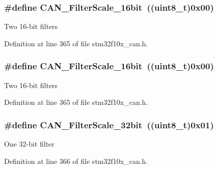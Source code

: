 \subsubsection[{\texorpdfstring{C\+A\+N\+\_\+\+Filter\+Scale\+\_\+16bit}{CAN_FilterScale_16bit}}]{\setlength{\rightskip}{0pt plus 5cm}\#define C\+A\+N\+\_\+\+Filter\+Scale\+\_\+16bit~(({\bf uint8\+\_\+t})0x00)}\hypertarget{group___c_a_n__filter__scale_ga9e0493937e73bcf9a4127eef2f255a95}{}\label{group___c_a_n__filter__scale_ga9e0493937e73bcf9a4127eef2f255a95}
Two 16-\/bit filters 

Definition at line 365 of file stm32f10x\+\_\+can.\+h.

\subsubsection[{\texorpdfstring{C\+A\+N\+\_\+\+Filter\+Scale\+\_\+16bit}{CAN_FilterScale_16bit}}]{\setlength{\rightskip}{0pt plus 5cm}\#define C\+A\+N\+\_\+\+Filter\+Scale\+\_\+16bit~(({\bf uint8\+\_\+t})0x00)}\hypertarget{group___c_a_n__filter__scale_ga9e0493937e73bcf9a4127eef2f255a95}{}\label{group___c_a_n__filter__scale_ga9e0493937e73bcf9a4127eef2f255a95}
Two 16-\/bit filters 

Definition at line 365 of file stm32f10x\+\_\+can.\+h.

\subsubsection[{\texorpdfstring{C\+A\+N\+\_\+\+Filter\+Scale\+\_\+32bit}{CAN_FilterScale_32bit}}]{\setlength{\rightskip}{0pt plus 5cm}\#define C\+A\+N\+\_\+\+Filter\+Scale\+\_\+32bit~(({\bf uint8\+\_\+t})0x01)}\hypertarget{group___c_a_n__filter__scale_gac63dfb0e11713c59268ee9f4aebab60e}{}\label{group___c_a_n__filter__scale_gac63dfb0e11713c59268ee9f4aebab60e}
One 32-\/bit filter 

Definition at line 366 of file stm32f10x\+\_\+can.\+h.

